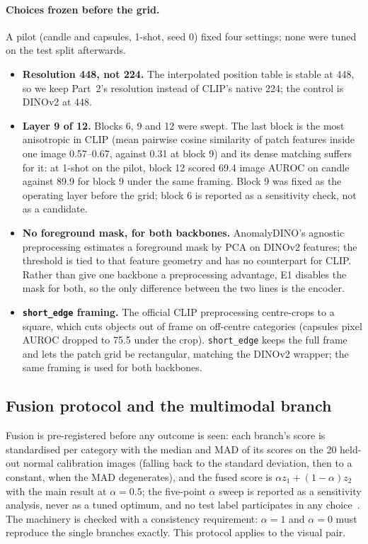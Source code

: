 \paragraph{Choices frozen before the grid.}
A pilot (candle and capsules, 1-shot, seed 0) fixed four settings; none were tuned on the
test split afterwards.
\begin{itemize}
  \item \textbf{Resolution 448, not 224.} The interpolated position table is stable at 448,
        so we keep Part~2's resolution instead of CLIP's native 224; the control is DINOv2
        at 448.
  \item \textbf{Layer 9 of 12.} Blocks 6, 9 and 12 were swept. The last block is the most
        anisotropic in CLIP (mean pairwise cosine similarity of patch features inside one
        image 0.57--0.67, against 0.31 at block 9) and its dense matching suffers for it: at
        1-shot on the pilot, block 12 scored 69.4 image AUROC on candle against 89.9 for
        block 9 under the same framing. Block 9 was fixed as the operating layer before the
        grid; block 6 is reported as a sensitivity check, not as a candidate.
  \item \textbf{No foreground mask, for both backbones.} AnomalyDINO's agnostic
        preprocessing estimates a foreground mask by PCA on DINOv2 features; the threshold
        is tied to that feature geometry and has no counterpart for CLIP. Rather than give
        one backbone a preprocessing advantage, E1 disables the mask for both, so the only
        difference between the two lines is the encoder.
  \item \textbf{\texttt{short\_edge} framing.} The official CLIP preprocessing
        centre-crops to a square, which cuts objects out of frame on off-centre categories
        (capsules pixel AUROC dropped to 75.5 under the crop). \texttt{short\_edge} keeps
        the full frame and lets the patch grid be rectangular, matching the DINOv2 wrapper;
        the same framing is used for both backbones.
\end{itemize}

\subsection{Fusion protocol and the multimodal branch}
\label{sec:method-fusion}

Fusion is pre-registered before any outcome is seen: each branch's score is standardised per
category with the median and MAD of its scores on the 20 held-out normal calibration images
(falling back to the standard deviation, then to a constant, when the MAD degenerates), and
the fused score is $\alpha z_1 + (1-\alpha) z_2$ with the main result at $\alpha = 0.5$; the
five-point $\alpha$ sweep is reported as a sensitivity analysis, never as a tuned optimum, and
no test label participates in any choice~\cite{guo2017calibration}. The machinery is checked
with a consistency requirement: $\alpha{=}1$ and $\alpha{=}0$ must reproduce the single
branches exactly. This protocol applies to the visual pair.

